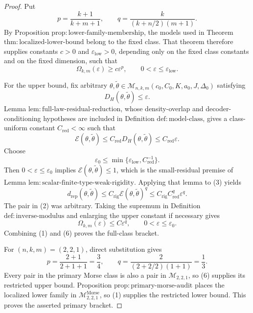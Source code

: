 \documentclass{article}
\begin{document}
\begin{proof}
Put
\[
p=\frac{k+1}{k+m+1},
\qquad
q=\frac{k}{(k+n/2)(m+1)}.
\]
By Proposition \(\mathrm{prop:lower\text{-}family\text{-}membership}\), the models used in Theorem \(\mathrm{thm:localized\text{-}lower\text{-}bound}\) belong to the fixed class. That theorem therefore supplies constants \(c>0\) and \(\varepsilon_{\mathrm{low}}>0\), depending only on the fixed class constants and on the fixed dimension, such that
\[
\Omega_{k,m}(\varepsilon)
\geq c\varepsilon^p,
\qquad
0<\varepsilon\leq\varepsilon_{\mathrm{low}}.
\tag{1}
\]

For the upper bound, fix arbitrary \(\theta,\widetilde\theta\in\mathcal M_{n,k,m}(c_0,C_0,K,a_0,J,\Delta_0)\) satisfying
\[
D_H(\theta,\widetilde\theta)\leq\varepsilon.
\tag{2}
\]
Lemma \(\mathrm{lem:full\text{-}law\text{-}residual\text{-}reduction}\), whose density-overlap and decoder-conditioning hypotheses are included in Definition \(\mathrm{def:model\text{-}class}\), gives a class-uniform constant \(C_{\mathrm{red}}<\infty\) such that
\[
\mathcal E(\theta,\widetilde\theta)
\leq C_{\mathrm{red}}D_H(\theta,\widetilde\theta)
\leq C_{\mathrm{red}}\varepsilon.
\tag{3}
\]
Choose
\[
\varepsilon_0
\leq
\min\{\varepsilon_{\mathrm{low}},C_{\mathrm{red}}^{-1}\}.
\tag{4}
\]
Then \(0<\varepsilon\leq\varepsilon_0\) implies \(\mathcal E(\theta,\widetilde\theta)\leq1\), which is the small-residual premise of Lemma \(\mathrm{lem:scalar\text{-}finite\text{-}type\text{-}weak\text{-}rigidity}\). Applying that lemma to (3) yields
\[
d_{\mathrm{rep}}(\theta,\widetilde\theta)
\leq C_{\mathrm{rig}}\mathcal E(\theta,\widetilde\theta)^q
\leq C_{\mathrm{rig}}C_{\mathrm{red}}^q\varepsilon^q.
\tag{5}
\]
The pair in (2) was arbitrary. Taking the supremum in Definition \(\mathrm{def:inverse\text{-}modulus}\) and enlarging the upper constant if necessary gives
\[
\Omega_{k,m}(\varepsilon)
\leq C\varepsilon^q,
\qquad
0<\varepsilon\leq\varepsilon_0.
\tag{6}
\]
Combining (1) and (6) proves the full-class bracket.

For \((n,k,m)=(2,2,1)\), direct substitution gives
\[
p=\frac{2+1}{2+1+1}=\frac34,
\qquad
q=\frac{2}{(2+2/2)(1+1)}=\frac13.
\tag{7}
\]
Every pair in the primary Morse class is also a pair in \(\mathcal M_{2,2,1}\), so (6) supplies its restricted upper bound. Proposition \(\mathrm{prop:primary\text{-}morse\text{-}audit}\) places the localized lower family in \(\mathcal M^{\mathrm{Morse}}_{2,2,1}\), so (1) supplies the restricted lower bound. This proves the asserted primary bracket.


\end{proof}
\end{document}
